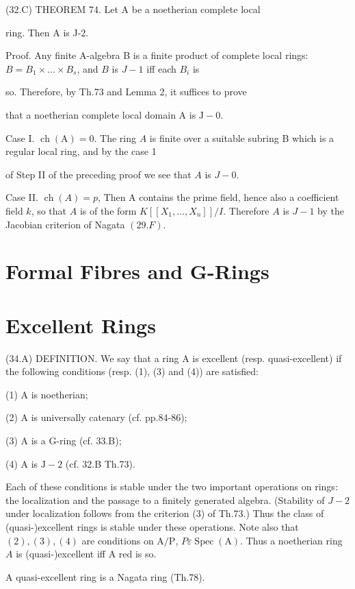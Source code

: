 (32.C) THEOREM 74. Let A be a noetherian complete local

ring. Then A is J-2.

Proof. Any finite A-algebra B is a finite product of complete local rings: $B=B_{1} \times \ldots \times B_{s}$, and $B$ is $J-1$ iff each $B_{i}$ is

so. Therefore, by Th.73 and Lemma 2, it suffices to prove

that a noetherian complete local domain A is $\mathrm{J}-0$.

Case I. $\operatorname{ch}(\mathrm{A})=0$. The ring $A$ is finite over a suitable subring B which is a regular local ring, and by the case 1

of Step II of the preceding proof we see that $A$ is $J-0$.

Case II. $\operatorname{ch}(A)=p$, Then A contains the prime field, hence also a coefficient field $k$, so that $A$ is of the form $K\left[\left[X_{1}, \ldots, X_{n}\right]\right] / I$. Therefore $A$ is $J-1$ by the Jacobian criterion of Nagata $(29 . F)$.

\section{Formal Fibres and G-Rings}


\section{Excellent Rings}
(34.A) DEFINITION. We say that a ring A is excellent (resp. quasi-excellent) if the following conditions (resp. (1), (3) and (4)) are satisfied:

(1) A is noetherian;

(2) A is universally catenary (cf. pp.84-86);

(3) A is a G-ring (cf. 33.B);

(4) A is $\mathrm{J}-2$ (cf. 32.B Th.73).

Each of these conditions is stable under the two important operations on rings: the localization and the passage to a finitely generated algebra. (Stability of $J-2$ under localization follows from the criterion (3) of Th.73.) Thus the class of (quasi-)excellent rings is stable under these operations. Note also that $(2),(3),(4)$ are conditions on $\mathrm{A} / \mathrm{P}$, $P \varepsilon \operatorname{Spec}(\mathrm{A})$. Thus a noetherian ring $A$ is (quasi-)excellent iff A red is so.

A quasi-excellent ring is a Nagata ring (Th.78).

